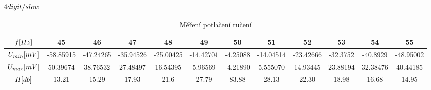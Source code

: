 \documentclass{article}
\begin{document}
\subsubsection*{\(4\-digit/slow\)}
\begin{table}[H]
    \footnotesize
    \hspace{-10mm}
    \begin{tabular}{|c|c|c|c|c|c|c|c|c|c|c|c|}
    \hline
    \(f\-[Hz]\)                     & 45        & 46	    & 47	    & 48	    & 49	    & 50	    & 51	    & 52	    & 53	    & 54        & 55        \\ \hline
    \(U_{min}\-[mV]\) 	            & -58.85915 & -47.24265 & -35.94526 & -25.00425 & -14.42704 & -4.25088  & -14.04514 & -23.42666 & -32.3752  & -40.8929  & -48.95002 \\ \hline
    \(U_{max}\-[mV]\)	            & 50.39674	& 38.76532	& 27.48497	& 16.54395	& 5.96569	& -4.21890	& 5.555070  & 14.93445	& 23.88194	& 32.38476  & 40.44185  \\ \hline
    \(H\-[db]\)                     & 13.21     & 15.29		& 17.93	   	& 21.6		& 27.79		& 83.88		& 28.13		& 22.30		& 18.98		& 16.68		& 14.95     \\ \hline
    \end{tabular}
    \caption{\label{potlaceni_ruseni} Měření potlačení ručení}
    \normalsize
\end{table}
\end{document}
